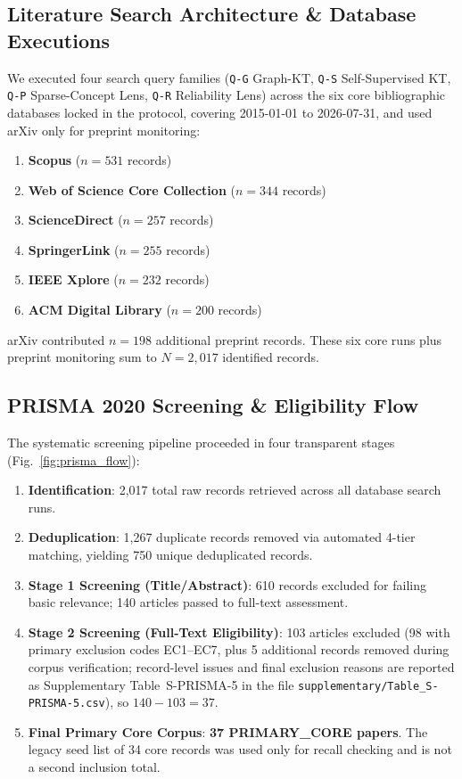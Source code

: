 \documentclass[lettersize,journal]{IEEEtran}
\begin{document}
\subsection{Literature Search Architecture \& Database Executions}
We executed four search query families (\texttt{Q-G} Graph-KT, \texttt{Q-S} Self-Supervised KT, \texttt{Q-P} Sparse-Concept Lens, \texttt{Q-R} Reliability Lens) across the six core bibliographic databases locked in the protocol, covering 2015-01-01 to 2026-07-31, and used arXiv only for preprint monitoring:
\begin{enumerate}
    \item \textbf{Scopus} ($n = 531$ records)
    \item \textbf{Web of Science Core Collection} ($n = 344$ records)
    \item \textbf{ScienceDirect} ($n = 257$ records)
    \item \textbf{SpringerLink} ($n = 255$ records)
    \item \textbf{IEEE Xplore} ($n = 232$ records)
    \item \textbf{ACM Digital Library} ($n = 200$ records)
\end{enumerate}
arXiv contributed $n = 198$ additional preprint records. These six core runs plus preprint monitoring sum to $N = 2,017$ identified records.

\subsection{PRISMA 2020 Screening \& Eligibility Flow}
The systematic screening pipeline proceeded in four transparent stages (Fig.~\ref{fig:prisma_flow}):
\begin{enumerate}
    \item \textbf{Identification}: 2,017 total raw records retrieved across all database search runs.
    \item \textbf{Deduplication}: 1,267 duplicate records removed via automated 4-tier matching, yielding 750 unique deduplicated records.
    \item \textbf{Stage 1 Screening (Title/Abstract)}: 610 records excluded for failing basic relevance; 140 articles passed to full-text assessment.
    \item \textbf{Stage 2 Screening (Full-Text Eligibility)}: 103 articles excluded (98 with primary exclusion codes EC1--EC7, plus 5 additional records removed during corpus verification; record-level issues and final exclusion reasons are reported as Supplementary Table~S-PRISMA-5 in the file \texttt{supplementary/Table\_S-PRISMA-5.csv}), so $140 - 103 = 37$.
    \item \textbf{Final Primary Core Corpus}: \textbf{37 PRIMARY\_CORE papers}. The legacy seed list of 34 core records was used only for recall checking and is not a second inclusion total.
\end{enumerate}
\end{document}

